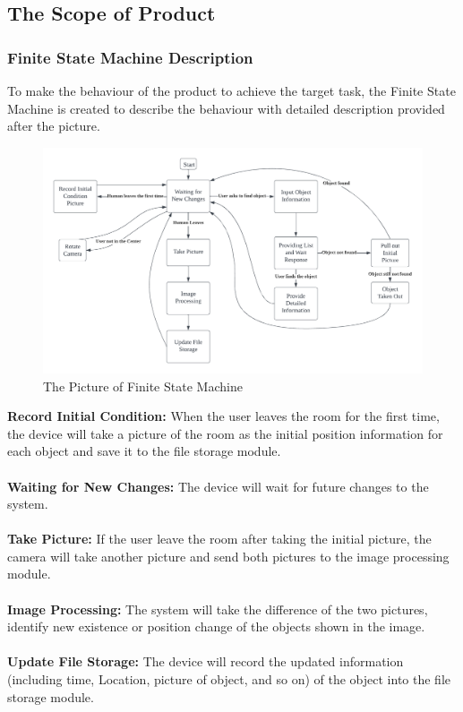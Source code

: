 \documentclass[12pt]{article}
\begin{document}
\subsection{The Scope of Product}
\subsubsection{Finite State Machine Description}
To make the behaviour of the product to achieve the target task, the Finite State Machine is created to describe the behaviour with detailed description provided after the picture. 
\begin{figure}[H]
    \centering
    \includegraphics[scale=0.5]{FSM.png}
    \caption{The Picture of Finite  State Machine}
\end{figure}
\noindent\textbf{Record Initial Condition:} When the user leaves the room for the first time, the device will take a picture of the room as the initial position information for each object and save it to the file storage module. \\\\
\textbf{Waiting for New Changes:} The device will wait for future changes to the system. \\\\
\textbf{Take Picture:} If the user leave the room after taking the initial picture, the camera will take another picture and send both pictures to the image processing module.  \\\\
\textbf{Image Processing:} The system will take the difference of the two pictures, identify new existence or position change of the objects shown in the image.\\\\
\textbf{Update File Storage:} The device will record the updated information (including time, Location, picture of object, and so on) of the object into the file storage module.\\\\
\end{document}
